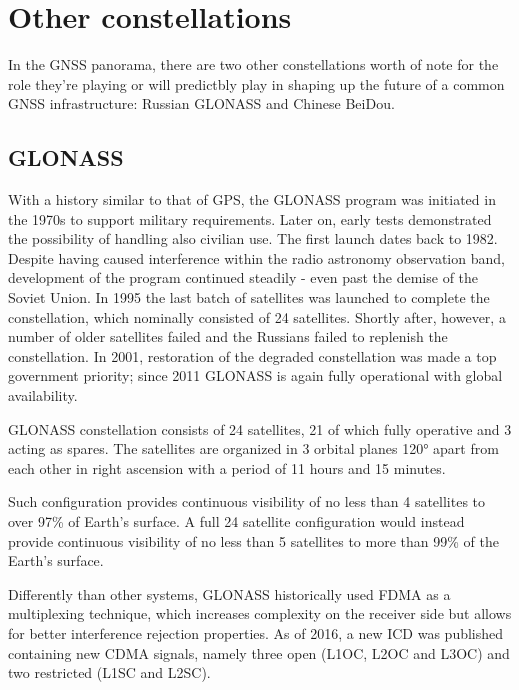 \section{Other constellations}
In the GNSS panorama, there are two other constellations worth of note for the
role they're playing or will predictbly play in shaping up the future of a
common GNSS infrastructure: Russian GLONASS and Chinese BeiDou.

\subsection{GLONASS}
With a history similar to that of GPS, the GLONASS program was initiated in the
1970s to support military requirements. Later on, early tests demonstrated the
possibility of handling also civilian use. The first launch dates back to 1982.
Despite having caused interference within the radio astronomy observation band,
development of the program continued steadily - even past the demise of the
Soviet Union. In 1995 the last batch of satellites was launched to complete the
constellation, which nominally consisted of 24 satellites. Shortly after,
however, a number of older satellites failed and the Russians failed to
replenish the constellation. In 2001, restoration of the degraded constellation
was made a top government priority; since 2011 GLONASS is again fully
operational with global availability.

\par

GLONASS constellation consists of 24 satellites, 21 of which fully operative and
3 acting as spares. The satellites are organized in 3 orbital planes 120° apart
from each other in right ascension with a period of 11 hours and 15 minutes.

Such configuration provides continuous visibility of no less than 4 satellites
to over 97\% of Earth's surface. A full 24 satellite configuration would instead
provide continuous visibility of no less than 5 satellites to more than 99\% of
the Earth's surface.

\par

Differently than other systems, GLONASS historically used FDMA as a multiplexing
technique, which increases complexity on the receiver side but allows for better
interference rejection properties. As of 2016, a new ICD was published
containing new CDMA signals, namely three open (L1OC, L2OC and L3OC) and two
restricted (L1SC and L2SC).

